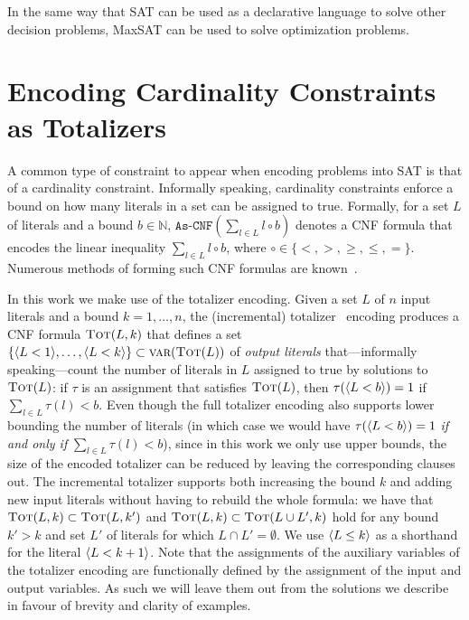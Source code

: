 In the same way that SAT can be used as a declarative language to solve other decision problems, MaxSAT can be used to solve optimization problems.

\begin{example}\label{ex:maxsat-modelling}
\end{example}

\section{Encoding Cardinality Constraints as Totalizers\label{sec:card-const}}

A common type of constraint to appear when encoding problems into SAT is that of a cardinality constraint.
Informally speaking, cardinality constraints enforce a bound on how many literals in a set can be assigned to true.
Formally, for a set $L$ of literals and a bound $b \in \mathbb{N}$, $\texttt{As-CNF}\left(\sum_{l \in L} l \circ b\right)$ denotes a CNF formula that encodes the linear inequality $\sum_{l \in L} l \circ b$, where $\circ \in \{< ,> ,\geq, \leq, =\}$.
Numerous methods of forming such CNF formulas are known~\autocite{DBLP:conf/cp/BailleuxB03}.

In this work we make use of the totalizer encoding.
Given a set $L$ of $n$ input literals and a bound $k=1, \ldots, n$, the (incremental) totalizer~\autocite{DBLP:conf/cp/BailleuxB03,DBLP:conf/cp/MartinsJML14} encoding produces a CNF formula $\textsc{Tot}(L, k)$ that defines a set $\{\langle L < 1 \rangle, \ldots, \langle L < k \rangle\} \subset \textsc{var}(\textsc{Tot}(L))$ of \emph{output literals} that---informally speaking---count the number of literals in $L$ assigned to true by solutions to $\textsc{Tot}(L)$:
if $\tau$ is an assignment that satisfies $\textsc{Tot}(L)$, then $\tau(\langle L < b \rangle) = 1$ if $\sum_{l \in L} \tau(l) < b$.
Even though the full totalizer encoding also supports lower bounding the number of literals (in which case we would have $\tau(\langle L < b \rangle)=1$ \emph{if and only if} $\sum_{l \in L} \tau(l) < b$), since in this work we only use upper bounds, the size of the encoded totalizer can be reduced by leaving the corresponding clauses out.
The incremental totalizer supports both increasing the bound $k$ and adding new input literals without having to rebuild the whole formula:
we have that $\textsc{Tot}(L, k) \subset \textsc{Tot}(L, k')$ and $\textsc{Tot}(L, k) \subset  \textsc{Tot}(L \cup L', k)$ hold for any bound $k' > k$ and set $L'$ of literals for which $L \cap L' =  \emptyset$. 
We use $\langle L \leq k \rangle$ as a shorthand for the literal $\langle L < k+1 \rangle$.
Note that the assignments of the auxiliary variables of the totalizer encoding are functionally defined by the assignment of the input and output variables.
As such we will leave them out from the solutions we describe in favour of brevity and clarity of examples. 